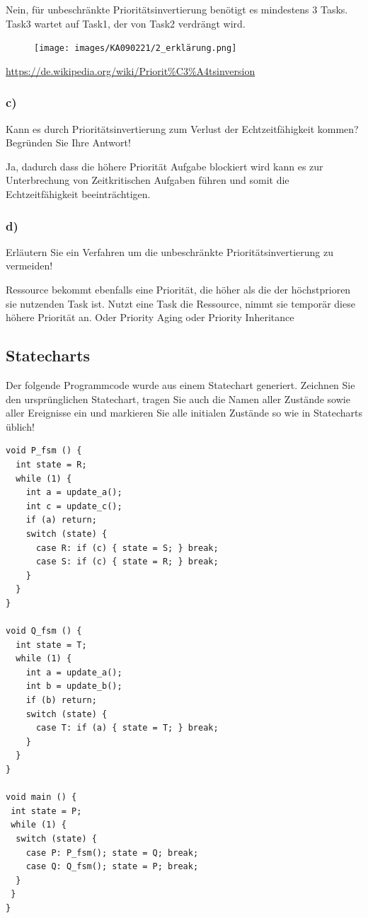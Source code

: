 Nein, für unbeschränkte Prioritätsinvertierung benötigt es mindestens 3 Tasks. Task3 wartet auf Task1, der von Task2 verdrängt wird.
\begin{figure}[H]
  \texttt{[image: images/KA090221/2\_erklärung.png]}
  \centering
\end{figure}
\url{https://de.wikipedia.org/wiki/Priorit%C3%A4tsinversion}

\subsubsection{c)}
Kann es durch Prioritätsinvertierung zum Verlust der Echtzeitfähigkeit kommen? Begründen Sie Ihre
Antwort!

Ja, dadurch dass die höhere Priorität Aufgabe blockiert wird kann es zur Unterbrechung von Zeitkritischen Aufgaben führen und somit
die Echtzeitfähigkeit beeinträchtigen.

\subsubsection{d)}
Erläutern Sie ein Verfahren um die unbeschränkte Prioritätsinvertierung zu vermeiden!

Ressource bekommt ebenfalls eine Priorität, die höher als die der höchstprioren sie nutzenden Task ist.
Nutzt eine Task die Ressource, nimmt sie temporär diese höhere Priorität an. Oder Priority Aging oder Priority Inheritance

\subsection{Statecharts}
Der folgende Programmcode wurde aus einem Statechart generiert. Zeichnen Sie den ursprünglichen
Statechart, tragen Sie auch die Namen aller Zustände sowie aller Ereignisse ein und markieren Sie alle
initialen Zustände so wie in Statecharts üblich!

\begin{lstlisting}
void P_fsm () {
  int state = R;
  while (1) {
    int a = update_a();
    int c = update_c();
    if (a) return;
    switch (state) {
      case R: if (c) { state = S; } break;
      case S: if (c) { state = R; } break;
    }
  } 
}

void Q_fsm () {
  int state = T;
  while (1) {
    int a = update_a();
    int b = update_b();
    if (b) return;
    switch (state) {
      case T: if (a) { state = T; } break;
    }
  }
}

void main () {
 int state = P;
 while (1) {
  switch (state) {
    case P: P_fsm(); state = Q; break;
    case Q: Q_fsm(); state = P; break;
  }
 }
}
\end{lstlisting}

